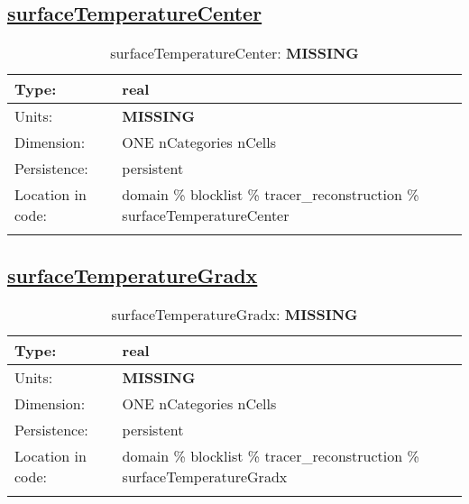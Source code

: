 \subsection[surfaceTemperatureCenter]{\hyperref[sec:var_tab_tracer_reconstruction]{surfaceTemperatureCenter}}
\label{subsec:var_sec_tracer_reconstruction_surfaceTemperatureCenter}
\begin{center}
\begin{longtable}{| p{2.0in} | p{4.0in} |}
        \hline 
        Type: & real \\
        \hline 
        Units: & {\bf \color{red} MISSING} \\
        \hline 
        Dimension: & ONE nCategories nCells \\
        \hline 
        Persistence: & persistent \\
        \hline 
         Location in code: & domain \% blocklist \% tracer\_reconstruction \% surfaceTemperatureCenter \\
         \hline 
    \caption{surfaceTemperatureCenter: {\bf \color{red} MISSING}}
\end{longtable}
\end{center}
\subsection[surfaceTemperatureGradx]{\hyperref[sec:var_tab_tracer_reconstruction]{surfaceTemperatureGradx}}
\label{subsec:var_sec_tracer_reconstruction_surfaceTemperatureGradx}
\begin{center}
\begin{longtable}{| p{2.0in} | p{4.0in} |}
        \hline 
        Type: & real \\
        \hline 
        Units: & {\bf \color{red} MISSING} \\
        \hline 
        Dimension: & ONE nCategories nCells \\
        \hline 
        Persistence: & persistent \\
        \hline 
         Location in code: & domain \% blocklist \% tracer\_reconstruction \% surfaceTemperatureGradx \\
         \hline 
    \caption{surfaceTemperatureGradx: {\bf \color{red} MISSING}}
\end{longtable}
\end{center}
